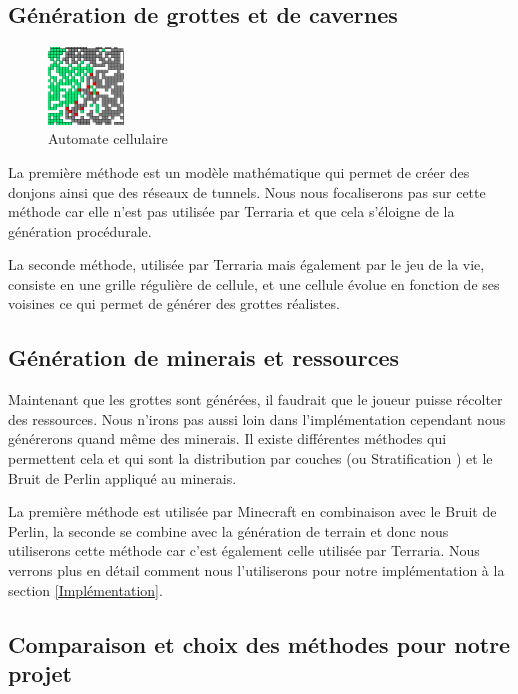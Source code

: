 \documentclass[12pt]{article}
\begin{document}
\subsection{Génération de grottes et de cavernes}
\begin{figure}
  \centering
  \includegraphics[width=0.18\textwidth]{assets/automate_cellulaire.png}
  \caption{Automate cellulaire}
  \label{automate_cellulaire}
  \vspace{0.5cm}
\end{figure}



La première méthode est un modèle mathématique qui permet de créer des donjons ainsi que des réseaux de tunnels. Nous nous focaliserons pas sur cette méthode car elle n'est pas utilisée par Terraria et que cela s'éloigne de la génération procédurale.\par 
La seconde méthode, utilisée par Terraria mais également par le jeu de la vie, consiste en une grille régulière de cellule, et une cellule évolue en fonction de ses voisines ce qui permet de générer des grottes réalistes.
\par
\vspace{2.5cm}
\subsection{Génération de minerais et ressources}
Maintenant que les grottes sont générées, il faudrait que le joueur puisse récolter des ressources. Nous n'irons pas aussi loin dans l'implémentation cependant nous générerons quand même des minerais. Il existe différentes méthodes qui permettent cela et qui sont la distribution par couches (ou Stratification \cite{stratification}) et le Bruit de Perlin appliqué au minerais. \par
La première méthode est utilisée par Minecraft en combinaison avec le Bruit de Perlin, la seconde se combine avec la génération de terrain et donc nous utiliserons cette méthode car c'est également celle utilisée par Terraria. Nous verrons plus en détail comment nous l'utiliserons pour notre implémentation à la section \ref{Implémentation}.
\vspace{1cm}
\subsection{Comparaison et choix des méthodes pour notre projet}
\end{document}
